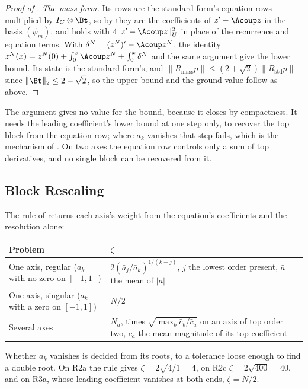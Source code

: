 \begin{proof}[Proof of ]
\emph{The mass form.} Its rows are the standard form's equation rows multiplied by $I_C\otimes\Bt$, so by  they are the coefficients of $z'-\Acoup z$ in the basis $(\psi_m)$, and  holds with $4\|z'-\Acoup z\|_U^2$ in place of the recurrence and equation terms. With $\delta^N=(z^N)'-\Acoup z^N$, the identity $z^N(x)=z^N(0)+\int_0^x\Acoup z^N+\int_0^x\delta^N$ and the same argument give the lower bound. Its state is the standard form's, and $\|R_{\mathrm{mass}}p\|\le(2+\sqrt2)\|R_{\mathrm{std}}p\|$ since $\|\Bt\|_2\le2+\sqrt2$, so the upper bound and the ground value follow as above.
\end{proof}

The argument gives no value for the bound, because it closes by compactness. It needs the leading coefficient's lower bound at one step only, to recover the top block from the equation row; where $a_k$ vanishes that step fails, which is the mechanism of . On two axes the equation row controls only a sum of top derivatives, and no single block can be recovered from it.

\subsection{Block Rescaling}
\label{app:block-rescaling}

The rule of  returns each axis's weight from the equation's coefficients and the resolution alone:

\begin{center}
\small
\begin{tabular}{@{}p{} p{}@{}}
\toprule
Problem & $\zeta$ \\
\midrule
One axis, regular ($a_k$ with no zero on $[-1,1]$) & $2(\bar a_j/\bar a_k)^{1/(k-j)}$, $j$ the lowest order present, $\bar a$ the mean of $|a|$ \\
One axis, singular ($a_k$ with a zero on $[-1,1]$) & $N/2$ \\
Several axes & $N_a$, times $\sqrt{\max_b\bar c_b/\bar c_a}$ on an axis of top order two, $\bar c_a$ the mean magnitude of its top coefficient \\
\bottomrule
\end{tabular}
\end{center}

Whether $a_k$ vanishes is decided from its roots, to a tolerance loose enough to find a double root. On R2a the rule gives $\zeta=2\sqrt{4/1}=4$, on R2c $\zeta=2\sqrt{400}=40$, and on R3a, whose leading coefficient vanishes at both ends, $\zeta=N/2$.

